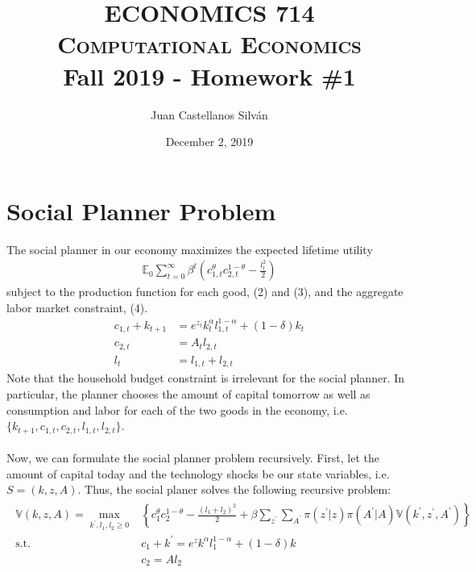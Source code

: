 \documentclass[11pt,a4paper]{article}
\begin{document}
\title{{\huge\textsc{ECONOMICS 714}} \\
\Large\textsc{Computational Economics} \\ Fall 2019 - Homework \#1}
\author{\Large{Juan Castellanos Silv\'{a}n}}
\date{December 2, 2019}
\maketitle

\section{Social Planner Problem}
The social planner in our economy maximizes the expected lifetime utility
\begin{align}
\mathbb{E}_{0} \sum_{t=0}^{\infty} \beta^{t}\left(c_{1, t}^{\theta} c_{2, t}^{1-\theta}-\frac{l_{t}^{2}}{2}\right)
\end{align}
subject to the production function for each good, (2) and (3), and the aggregate labor market constraint, (4).
\begin{align}
c_{1, t}+ k_{t+1}&=e^{z_{t}} k_{t}^{\alpha} l_{1, t}^{1-\alpha}  + (1-\delta) k_{t} \\
c_{2, t} &= A_t l_{2,t} \\
l_{t} &= l_{1,t} + l_{2,t}
\end{align}
Note that the household budget constraint is irrelevant for the social planner. In particular, the planner chooses the amount of capital tomorrow as well as consumption and labor for each of the two goods in the economy, i.e. $\{k_{t+1}, c_{1,t}, c_{2,t}, l_{1,t}, l_{2,t}\}$. 
\\
\\
Now, we can formulate the social planner problem recursively. First, let the amount of capital today and the technology shocks be our state variables, i.e. $S = (k , z, A)$. Thus, the social planer solves the following recursive problem:
\begin{align}
\begin{split}
\mathbb{V}(k,z,A)=\max _{k^{\prime}, l_1, l_2 \geq 0}&\left\{c_{1}^{\theta} c_{2}^{1-\theta}-\frac{(l_{1}+l_{2})^{2}}{2}+\beta\sum_{z^{\prime}} \sum_{A^{\prime}}\pi\left(z^{\prime}| z\right) \pi\left(A^{\prime} | A\right) \mathbb{V}\left( k^{\prime}, z^{\prime},A^{\prime}\right)\right\} \\
\text{s.t.} \quad & c_{1} + k^{\prime} = e^{z} k^{\alpha} l_{1}^{1-\alpha} + (1-\delta) k  \\
 & c_{2} = A l_{2} 
 \end{split}
\end{align}
\end{document}
